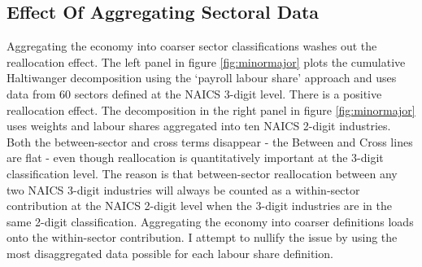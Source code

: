 \subsection{Effect Of Aggregating Sectoral Data\label{sec: minormajor}}

Aggregating the economy into coarser sector classifications washes out the reallocation effect. The left panel in figure \ref{fig:minormajor} plots the cumulative Haltiwanger decomposition using the `payroll labour share' approach and uses data from 60 sectors defined at the NAICS 3-digit level. There is a positive reallocation effect. The decomposition in the right panel in figure \ref{fig:minormajor} uses weights and labour shares aggregated into ten NAICS 2-digit industries. Both the between-sector and cross terms disappear - the Between and Cross lines are flat - even though reallocation is quantitatively important at the 3-digit classification level. The reason is that between-sector reallocation between any two NAICS 3-digit industries will always be counted as a within-sector contribution at the NAICS 2-digit level when the 3-digit industries are in the same 2-digit classification. Aggregating the economy into coarser definitions loads onto the within-sector contribution. I attempt to nullify the issue by using the most disaggregated data possible for each labour share definition. 

